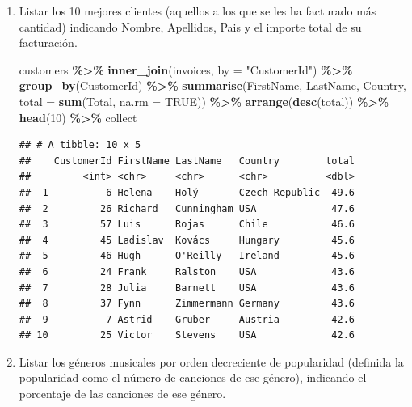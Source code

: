 \documentclass[
]{book}
\newenvironment{Shaded}{\begin{snugshade}}{\end{snugshade}}
\newcommand{\AttributeTok}[1]{\textcolor[rgb]{0.13,0.29,0.53}{#1}}
\newcommand{\ConstantTok}[1]{\textcolor[rgb]{0.56,0.35,0.01}{#1}}
\newcommand{\DecValTok}[1]{\textcolor[rgb]{0.00,0.00,0.81}{#1}}
\newcommand{\FunctionTok}[1]{\textcolor[rgb]{0.13,0.29,0.53}{\textbf{#1}}}
\newcommand{\NormalTok}[1]{#1}
\newcommand{\SpecialCharTok}[1]{\textcolor[rgb]{0.81,0.36,0.00}{\textbf{#1}}}
\newcommand{\StringTok}[1]{\textcolor[rgb]{0.31,0.60,0.02}{#1}}
\begin{document}
\begin{enumerate}
\def\labelenumi{\arabic{enumi}.}
\setcounter{enumi}{5}
\item
  Listar los 10 mejores clientes (aquellos a los que se les ha facturado más cantidad)
  indicando Nombre, Apellidos, Pais y el importe total de su facturación.

\begin{Shaded}
\begin{Highlighting}[]
\NormalTok{customers }\SpecialCharTok{\%\textgreater{}\%} \FunctionTok{inner\_join}\NormalTok{(invoices, }\AttributeTok{by =} \StringTok{"CustomerId"}\NormalTok{) }\SpecialCharTok{\%\textgreater{}\%} \FunctionTok{group\_by}\NormalTok{(CustomerId) }\SpecialCharTok{\%\textgreater{}\%} 
    \FunctionTok{summarise}\NormalTok{(FirstName, LastName, Country, }\AttributeTok{total =} \FunctionTok{sum}\NormalTok{(Total, }\AttributeTok{na.rm =} \ConstantTok{TRUE}\NormalTok{)) }\SpecialCharTok{\%\textgreater{}\%}  
    \FunctionTok{arrange}\NormalTok{(}\FunctionTok{desc}\NormalTok{(total)) }\SpecialCharTok{\%\textgreater{}\%} \FunctionTok{head}\NormalTok{(}\DecValTok{10}\NormalTok{) }\SpecialCharTok{\%\textgreater{}\%}\NormalTok{ collect}
\end{Highlighting}
\end{Shaded}

\begin{verbatim}
## # A tibble: 10 x 5
##    CustomerId FirstName LastName   Country        total
##         <int> <chr>     <chr>      <chr>          <dbl>
##  1          6 Helena    Holý       Czech Republic  49.6
##  2         26 Richard   Cunningham USA             47.6
##  3         57 Luis      Rojas      Chile           46.6
##  4         45 Ladislav  Kovács     Hungary         45.6
##  5         46 Hugh      O'Reilly   Ireland         45.6
##  6         24 Frank     Ralston    USA             43.6
##  7         28 Julia     Barnett    USA             43.6
##  8         37 Fynn      Zimmermann Germany         43.6
##  9          7 Astrid    Gruber     Austria         42.6
## 10         25 Victor    Stevens    USA             42.6
\end{verbatim}
\item
  Listar los géneros musicales por orden decreciente de popularidad
  (definida la popularidad como el número de canciones de ese género),
  indicando el porcentaje de las canciones de ese género.


\end{enumerate}
\end{document}
